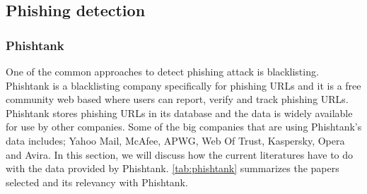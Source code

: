 \subsection{Phishing detection}


\subsubsection{Phishtank}

One of the common approaches to detect phishing attack is blacklisting.
Phishtank is a blacklisting company specifically for phishing URLs
and it is a free community web based where users can report, verify
and track phishing URLs. Phishtank stores phishing URLs in its database
and the data is widely available for use by other companies. Some
of the big companies that are using Phishtank\textquoteright s data
includes; Yahoo Mail, McAfee, APWG, Web Of Trust, Kaspersky, Opera
and Avira. In this section, we will discuss how the current literatures
have to do with the data provided by Phishtank. \autoref{tab:phishtank}
summarizes the papers selected and its relevancy with Phishtank.


